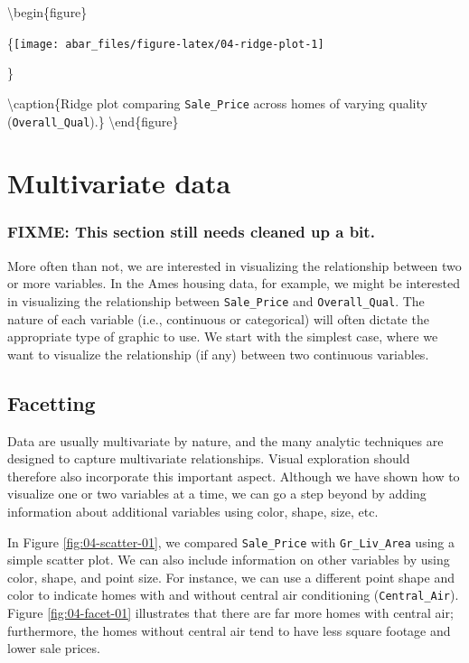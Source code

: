 \documentclass[]{book}
\theoremstyle{definition}
\theoremstyle{definition}
\theoremstyle{definition}
\theoremstyle{remark}
\begin{document}
\textbackslash{}begin\{figure\}

\{\centering \texttt{[image: abar\_files/figure-latex/04-ridge-plot-1]}

\}

\textbackslash{}caption\{Ridge plot comparing \texttt{Sale\_Price}
across homes of varying quality
(\texttt{Overall\_Qual}).\}\label{fig:04-ridge-plot}
\textbackslash{}end\{figure\}

\hypertarget{multivariate-data}{%
\section{Multivariate data}\label{multivariate-data}}

\hypertarget{fixme-this-section-still-needs-cleaned-up-a-bit.}{%
\subsubsection{FIXME: This section still needs cleaned up a
bit.}\label{fixme-this-section-still-needs-cleaned-up-a-bit.}}

More often than not, we are interested in visualizing the relationship
between two or more variables. In the Ames housing data, for example, we
might be interested in visualizing the relationship between
\texttt{Sale\_Price} and \texttt{Overall\_Qual}. The nature of each
variable (i.e., continuous or categorical) will often dictate the
appropriate type of graphic to use. We start with the simplest case,
where we want to visualize the relationship (if any) between two
continuous variables.

\hypertarget{facetting}{%
\subsection{Facetting}\label{facetting}}

Data are usually multivariate by nature, and the many analytic
techniques are designed to capture multivariate relationships. Visual
exploration should therefore also incorporate this important aspect.
Although we have shown how to visualize one or two variables at a time,
we can go a step beyond by adding information about additional variables
using color, shape, size, etc.

In Figure \ref{fig:04-scatter-01}, we compared \texttt{Sale\_Price} with
\texttt{Gr\_Liv\_Area} using a simple scatter plot. We can also include
information on other variables by using color, shape, and point size.
For instance, we can use a different point shape and color to indicate
homes with and without central air conditioning (\texttt{Central\_Air}).
Figure \ref{fig:04-facet-01} illustrates that there are far more homes
with central air; furthermore, the homes without central air tend to
have less square footage and lower sale prices.
\end{document}

